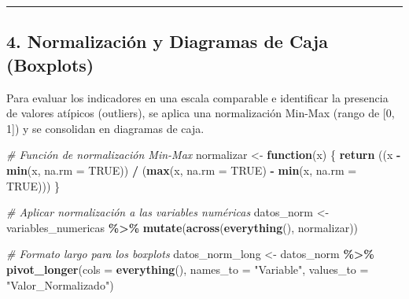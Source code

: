 \documentclass[
]{article}
\newenvironment{Shaded}{\begin{snugshade}}{\end{snugshade}}
\newcommand{\AttributeTok}[1]{\textcolor[rgb]{0.13,0.29,0.53}{#1}}
\newcommand{\CommentTok}[1]{\textcolor[rgb]{0.56,0.35,0.01}{\textit{#1}}}
\newcommand{\ConstantTok}[1]{\textcolor[rgb]{0.56,0.35,0.01}{#1}}
\newcommand{\ControlFlowTok}[1]{\textcolor[rgb]{0.13,0.29,0.53}{\textbf{#1}}}
\newcommand{\FunctionTok}[1]{\textcolor[rgb]{0.13,0.29,0.53}{\textbf{#1}}}
\newcommand{\NormalTok}[1]{#1}
\newcommand{\OtherTok}[1]{\textcolor[rgb]{0.56,0.35,0.01}{#1}}
\newcommand{\SpecialCharTok}[1]{\textcolor[rgb]{0.81,0.36,0.00}{\textbf{#1}}}
\newcommand{\StringTok}[1]{\textcolor[rgb]{0.31,0.60,0.02}{#1}}
\begin{document}
\begin{center}\rule{0.5\linewidth}{0.5pt}\end{center}

\subsection{4. Normalización y Diagramas de Caja
(Boxplots)}\label{normalizaciuxf3n-y-diagramas-de-caja-boxplots}

Para evaluar los indicadores en una escala comparable e identificar la
presencia de valores atípicos (outliers), se aplica una normalización
Min-Max (rango de {[}0, 1{]}) y se consolidan en diagramas de caja.

\begin{Shaded}
\begin{Highlighting}[]
\CommentTok{\# Función de normalización Min{-}Max}
\NormalTok{normalizar }\OtherTok{\textless{}{-}} \ControlFlowTok{function}\NormalTok{(x) \{}
  \FunctionTok{return}\NormalTok{ ((x }\SpecialCharTok{{-}} \FunctionTok{min}\NormalTok{(x, }\AttributeTok{na.rm =} \ConstantTok{TRUE}\NormalTok{)) }\SpecialCharTok{/}\NormalTok{ (}\FunctionTok{max}\NormalTok{(x, }\AttributeTok{na.rm =} \ConstantTok{TRUE}\NormalTok{) }\SpecialCharTok{{-}} \FunctionTok{min}\NormalTok{(x, }\AttributeTok{na.rm =} \ConstantTok{TRUE}\NormalTok{)))}
\NormalTok{\}}

\CommentTok{\# Aplicar normalización a las variables numéricas}
\NormalTok{datos\_norm }\OtherTok{\textless{}{-}}\NormalTok{ variables\_numericas }\SpecialCharTok{\%\textgreater{}\%} \FunctionTok{mutate}\NormalTok{(}\FunctionTok{across}\NormalTok{(}\FunctionTok{everything}\NormalTok{(), normalizar))}

\CommentTok{\# Formato largo para los boxplots}
\NormalTok{datos\_norm\_long }\OtherTok{\textless{}{-}}\NormalTok{ datos\_norm }\SpecialCharTok{\%\textgreater{}\%} 
  \FunctionTok{pivot\_longer}\NormalTok{(}\AttributeTok{cols =} \FunctionTok{everything}\NormalTok{(), }\AttributeTok{names\_to =} \StringTok{"Variable"}\NormalTok{, }\AttributeTok{values\_to =} \StringTok{"Valor\_Normalizado"}\NormalTok{)}


\end{Highlighting}
\end{Shaded}
\end{document}
